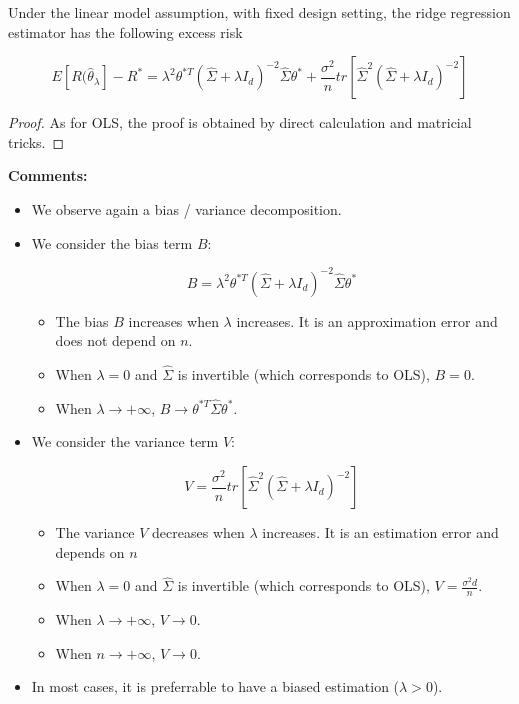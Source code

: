 \documentclass[
10pt, %
a4paper, %
oneside, %
headinclude,footinclude, %
BCOR5mm, %
]{scrartcl}
\begin{document}
\begin{proposition}
    
    Under the linear model assumption, with fixed design setting, the ridge regression estimator has the following excess risk

    \begin{equation}
	E[ R( \hat{\theta}_{\lambda}]-R^* = \lambda^2\theta^{*T} ( \hat{\Sigma}+\lambda I_d)^{-2} \hat{\Sigma} \theta^*+ \frac{\sigma^2}{n} tr[ \hat{\Sigma}^2( \hat{\Sigma}+\lambda I_d)^{-2} ]
    \end{equation}
\end{proposition}

\begin{proof}
As for OLS, the proof is obtained by direct calculation and matricial tricks.
\end{proof}


\textbf{{Comments:}} 
\begin{itemize}
    \item We observe again a bias / variance decomposition.
    \item We consider the bias term $B$:

        \begin{equation}
           B =  \lambda^2\theta^{*T} ( \hat{\Sigma}+\lambda I_d)^{-2} \hat{\Sigma} \theta^*
        \end{equation}
        \begin{itemize}
            \item The bias $B$ increases when $\lambda$ increases. It is an approximation error and does not depend on $n$.
            \item When $\lambda = 0$ and $ \hat{\Sigma}$ is invertible (which corresponds to OLS), $B=0$. 
            \item When $\lambda \rightarrow +\infty$, $B\rightarrow \theta^{*T} \hat{\Sigma}\theta^*$. 
        \end{itemize}

    \item We consider the variance term $V$:

        \begin{equation}
            V=\frac{\sigma^2}{n} tr[ \hat{\Sigma}^2( \hat{\Sigma}+\lambda I_d)^{-2} ]
        \end{equation}
        \begin{itemize}
            \item The variance $V$ decreases when $\lambda$ increases. It is an estimation error and depends on $n$
            \item When $\lambda = 0$ and $ \hat{\Sigma}$ is invertible (which corresponds to OLS), $V= \frac{\sigma^2d}{n} $.
            \item When $\lambda\rightarrow +\infty$, $V\rightarrow 0$. 
            \item When $n\rightarrow +\infty$, $V\rightarrow 0$. 
        \end{itemize}

    \item In most cases, it is preferrable to have a biased estimation ($\lambda >0$).
\end{itemize}
\end{document}
